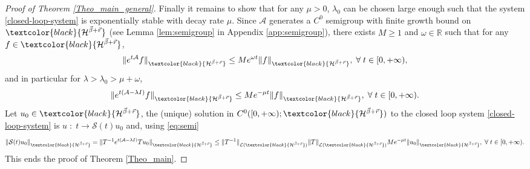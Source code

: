 \documentclass[11pt, dvipsnames]{amsart}
\begin{document}
\begin{proof}[Proof of Theorem \ref{Theo_main_general}]
Finally it remains to show that for any $\mu>0$, $\lambda_{0}$ can be chosen large enough such that the system \eqref{closed-loop-system} is exponentially stable with decay rate $\mu$. Since $\mathcal{A}$ generates a $C^{0}$ semigroup with finite growth bound on $\textcolor{black}{\mathcal{H}^{\vec{\beta}+\vec{r}}}$ (see Lemma \ref{lem:semigroup} in Appendix \ref{app:semigroup}), there exists $M\geq 1$ and $\omega\in\mathbb{R}$ such that for any $f\in\textcolor{black}{\mathcal{H}^{\vec{\beta}+\vec{r}}}$,
\begin{equation}
\|e^{t\mathcal{A}}f\|_{\textcolor{black}{\mathcal{H}^{\vec{\beta}+\vec{r}}}}\leq M e^{\omega t}\|f\|_{\textcolor{black}{\mathcal{H}^{\vec{\beta}+\vec{r}}}},\;\forall\;t\in[0,+\infty),
\end{equation}
and in particular for $\lambda>\lambda_{0}>\mu+\omega$,
\begin{equation}
\|e^{t(\mathcal{A}-\lambda I)}f\|_{\textcolor{black}{\mathcal{H}^{\vec{\beta}+\vec{r}}}}\leq M e^{-\mu t}\|f\|_{\textcolor{black}{\mathcal{H}^{\vec{\beta}+\vec{r}}}},\;\forall\;t\in[0,+\infty).
\end{equation}
Let $u_{0}\in \textcolor{black}{\mathcal{H}^{\vec{\beta}+\vec{r}}}$, the (unique) solution in $C^{0}([0,+\infty);\textcolor{black}{\mathcal{H}^{\vec{\beta}+\vec{r}}})$ to the closed loop system \eqref{closed-loop-system} is $u\;:\;t\rightarrow \mathcal{S}(t)u_{0}$ and, using \eqref{eq:semi}
\begin{equation}
    \|\mathcal{S}(t)u_{0}\|_{\textcolor{black}{\mathcal{H}^{\vec{\beta}+\vec{r}}}}=
    \|T^{-1}e^{t(\mathcal{A}-\lambda I)}T u_{0}\|_{\textcolor{black}{\mathcal{H}^{\vec{\beta}+\vec{r}}}}\leq \|T^{-1}\|_{\mathcal{L}(\textcolor{black}{\mathcal{H}^{\vec{\beta}+\vec{r}}})}\|T\|_{\mathcal{L}(\textcolor{black}{\mathcal{H}^{\vec{\beta}+\vec{r}}})}Me^{-\mu t}\|u_{0}\|_{\textcolor{black}{\mathcal{H}^{\vec{\beta}+\vec{r}}}},\;\forall\;t\in[0,+\infty).
\end{equation}
This ends the proof of Theorem \ref{Theo_main}.
\end{proof}
\label{sec:step7}
\end{document}
